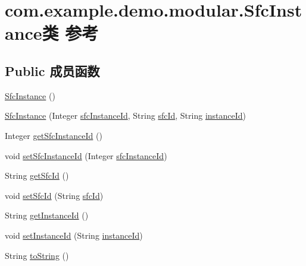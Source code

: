\hypertarget{classcom_1_1example_1_1demo_1_1modular_1_1_sfc_instance}{}\section{com.\+example.\+demo.\+modular.\+Sfc\+Instance类 参考}
\label{classcom_1_1example_1_1demo_1_1modular_1_1_sfc_instance}
\subsection*{Public 成员函数}
\begin{DoxyCompactItemize}
\item 
\mbox{\hyperlink{classcom_1_1example_1_1demo_1_1modular_1_1_sfc_instance_a67feeb6870e4d3abec14c848c3504be8}{Sfc\+Instance}} ()
\item 
\mbox{\hyperlink{classcom_1_1example_1_1demo_1_1modular_1_1_sfc_instance_a910fa4cd99d0dc357acb3f0b37c52506}{Sfc\+Instance}} (Integer \mbox{\hyperlink{classcom_1_1example_1_1demo_1_1modular_1_1_sfc_instance_a7cca0eaf233da157a9e9570efd9ec698}{sfc\+Instance\+Id}}, String \mbox{\hyperlink{classcom_1_1example_1_1demo_1_1modular_1_1_sfc_instance_aecd983c671ed63a1cfdf7c79b041b079}{sfc\+Id}}, String \mbox{\hyperlink{classcom_1_1example_1_1demo_1_1modular_1_1_sfc_instance_a47e9fbe0b517cf5d6b8a4f3b5e5a6005}{instance\+Id}})
\item 
Integer \mbox{\hyperlink{classcom_1_1example_1_1demo_1_1modular_1_1_sfc_instance_ad55ead29468d685fb59a7b088847acd9}{get\+Sfc\+Instance\+Id}} ()
\item 
void \mbox{\hyperlink{classcom_1_1example_1_1demo_1_1modular_1_1_sfc_instance_ad1cb41e094a471c799177d8539354471}{set\+Sfc\+Instance\+Id}} (Integer \mbox{\hyperlink{classcom_1_1example_1_1demo_1_1modular_1_1_sfc_instance_a7cca0eaf233da157a9e9570efd9ec698}{sfc\+Instance\+Id}})
\item 
String \mbox{\hyperlink{classcom_1_1example_1_1demo_1_1modular_1_1_sfc_instance_a9bc451336865779b9ecdcc06e90d5104}{get\+Sfc\+Id}} ()
\item 
void \mbox{\hyperlink{classcom_1_1example_1_1demo_1_1modular_1_1_sfc_instance_a8890e713d27ddc8c818b517601497153}{set\+Sfc\+Id}} (String \mbox{\hyperlink{classcom_1_1example_1_1demo_1_1modular_1_1_sfc_instance_aecd983c671ed63a1cfdf7c79b041b079}{sfc\+Id}})
\item 
String \mbox{\hyperlink{classcom_1_1example_1_1demo_1_1modular_1_1_sfc_instance_a08eec4228c81ae411fbcad7789ef6085}{get\+Instance\+Id}} ()
\item 
void \mbox{\hyperlink{classcom_1_1example_1_1demo_1_1modular_1_1_sfc_instance_adaca56307cec6a01e50aa06868a959e6}{set\+Instance\+Id}} (String \mbox{\hyperlink{classcom_1_1example_1_1demo_1_1modular_1_1_sfc_instance_a47e9fbe0b517cf5d6b8a4f3b5e5a6005}{instance\+Id}})
\item 
String \mbox{\hyperlink{classcom_1_1example_1_1demo_1_1modular_1_1_sfc_instance_a8bea4f65081dceeb0c7f2dfe2bdec09e}{to\+String}} ()
\end{DoxyCompactItemize}
